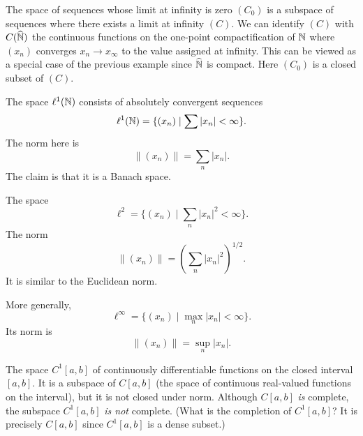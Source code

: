 \begin{example}
The space of sequences whose limit at infinity is zero $(C_{0})$ is a
subspace of sequences where there exists a limit at infinity $(C)$. We
can identify $(C)$ with $C(\widehat{\mathbb{N}})$ the continuous functions on
the one-point compactification of $\mathbb{N}$ where $(x_{n})$ converges
$x_{n}\to x_{\infty}$ to the value assigned at infinity. This can be
viewed as a special case of the previous example since $\widehat{\mathbb{N}}$
is compact. Here $(C_{0})$ is a closed subset of $(C)$.
\end{example}

\begin{example}
The space $\ell^{1}(\mathbb{N})$ consists of absolutely convergent sequences
\begin{equation}
\ell^{1}(\mathbb{N})=\{(x_{n})\mid\sum|x_{n}|<\infty\}.
\end{equation}
The norm here is
\begin{equation}
\|(x_{n})\|=\sum_{n}|x_{n}|.
\end{equation}
The claim is that it is a Banach space.
\end{example}

\begin{example}
The space 
\begin{equation}
\ell^{2}=\{(x_{n})\mid \sum_{n}|x_{n}|^{2}<\infty\}.
\end{equation}
The norm
\begin{equation}
\|(x_{n})\|=\left(\sum_{n}|x_{n}|^{2}\right)^{1/2}.
\end{equation}
It is similar to the Euclidean norm.
\end{example}

\begin{example}
More generally, 
\begin{equation}
\ell^{\infty}=\{(x_{n})\mid\max_{n}|x_{n}|<\infty\}.
\end{equation}
Its norm is
\begin{equation}
\|(x_{n})\|=\sup_{n}|x_{n}|.
\end{equation}
\end{example}

\begin{non-example}
The space $C^{1}[a,b]$ of continuously differentiable functions on the
closed interval $[a,b]$. It is a subspace of $C[a,b]$ (the space of
continuous real-valued functions on the interval), but it is not
closed under norm. Although $C[a,b]$ \emph{is} complete, the subspace
$C^{1}[a,b]$ \emph{is not} complete. (What is the completion of $C^{1}[a,b]$?
It is precisely $C[a,b]$ since $C^{1}[a,b]$ is a dense subset.)
\end{non-example}

